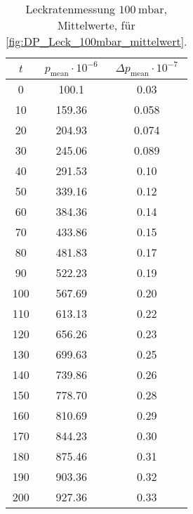 \begin{table}[H]
    \centering
    \caption{Leckratenmessung $\SI{100}{\milli\bar}$, Mittelwerte, für  \autoref{fig:DP_Leck_100mbar_mittelwert}.}
    \label{tab:DP_Leck_100mbar_mittelwert}
    \begin{tabular}{c c c}
        \toprule
        {$t$} & {$p_\text{mean} \cdot 10^{-6}$} & {$\Delta p_\text{mean} \cdot 10^{-7}$}\\
        \midrule
        0   & 100.1 & 0.03  \\
        10  & 159.36 & 0.058\\
        20  & 204.93 & 0.074\\
        30  & 245.06 & 0.089\\
        40  & 291.53 & 0.10 \\
        50  & 339.16 & 0.12 \\
        60  & 384.36 & 0.14 \\
        70  & 433.86 & 0.15 \\
        80  & 481.83 & 0.17 \\
        90  & 522.23 & 0.19 \\
        100 & 567.69 & 0.20 \\
        110 & 613.13 & 0.22 \\
        120 & 656.26 & 0.23 \\
        130 & 699.63 & 0.25 \\
        140 & 739.86 & 0.26 \\
        150 & 778.70 & 0.28 \\
        160 & 810.69 & 0.29 \\
        170 & 844.23 & 0.30 \\
        180 & 875.46 & 0.31 \\
        190 & 903.36 & 0.32 \\
        200 & 927.36 & 0.33 \\
        \bottomrule
    \end{tabular}
\end{table}

